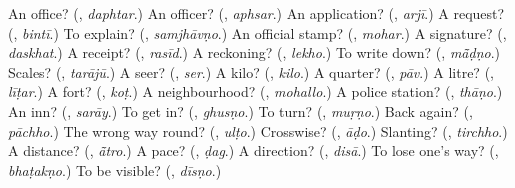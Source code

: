 \begin{tcolorbox}[breakable,colback=teal!4,colframe=teal!35!black,title={Before you move on}]
An office? (\textbf{}, \emph{daphtar}.) An officer? (\textbf{}, \emph{aphsar}.) An application? (\textbf{}, \emph{arjī}.) A request? (\textbf{}, \emph{bintī}.) To explain? (\textbf{}, \emph{samjhāvṇo}.) An official stamp? (\textbf{}, \emph{mohar}.) A signature? (\textbf{}, \emph{daskhat}.) A receipt? (\textbf{}, \emph{rasīd}.) A reckoning? (\textbf{}, \emph{lekho}.) To write down? (\textbf{}, \emph{mā̃ḍṇo}.) Scales? (\textbf{}, \emph{tarājū}.) A seer? (\textbf{}, \emph{ser}.) A kilo? (\textbf{}, \emph{kilo}.) A quarter? (\textbf{}, \emph{pāv}.) A litre? (\textbf{}, \emph{līṭar}.) A fort? (\textbf{}, \emph{koṭ}.) A neighbourhood? (\textbf{}, \emph{mohallo}.) A police station? (\textbf{}, \emph{thāṇo}.) An inn? (\textbf{}, \emph{sarāy}.) To get in? (\textbf{}, \emph{ghusṇo}.) To turn? (\textbf{}, \emph{muṛṇo}.) Back again? (\textbf{}, \emph{pāchho}.) The wrong way round? (\textbf{}, \emph{ulṭo}.) Crosswise? (\textbf{}, \emph{āḍo}.) Slanting? (\textbf{}, \emph{tirchho}.) A distance? (\textbf{}, \emph{ā̃tro}.) A pace? (\textbf{}, \emph{ḍag}.) A direction? (\textbf{}, \emph{disā}.) To lose one's way? (\textbf{}, \emph{bhaṭakṇo}.) To be visible? (\textbf{}, \emph{dīsṇo}.)
\end{tcolorbox}
